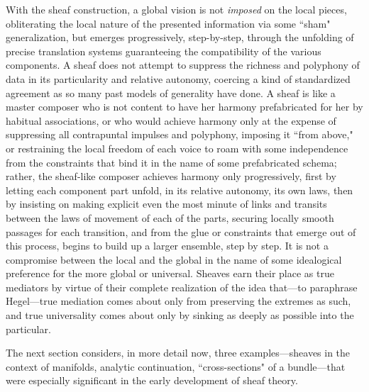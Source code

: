 \documentclass[a4paper]{book}
\theoremstyle{definition}
\theoremstyle{definition}
\theoremstyle{definition}
\theoremstyle{theorem}
\theoremstyle{definition}
\begin{document}
With the sheaf construction, a global vision is not \textit{imposed} on the local pieces, obliterating the local nature of the presented information via some ``sham" generalization, but emerges progressively, step-by-step, through the unfolding of precise translation systems guaranteeing the compatibility of the various components. A sheaf does not attempt to suppress the richness and polyphony of data in its particularity and relative autonomy, coercing a kind of standardized agreement as so many past models of generality have done. A sheaf is like a master composer who is not content to have her harmony prefabricated for her by habitual associations, or who would achieve harmony only at the expense of suppressing all contrapuntal impulses and polyphony, imposing it ``from above," or restraining the local freedom of each voice to roam with some independence from the constraints that bind it in the name of some prefabricated schema; rather, the sheaf-like composer achieves harmony only progressively, first by letting each component part unfold, in its relative autonomy, its own laws, then by insisting on making explicit even the most minute of links and transits between the laws of movement of each of the parts, securing locally smooth passages for each transition, and from the glue or constraints that emerge out of this process, begins to build up a larger ensemble, step by step. It is not a compromise between the local and the global in the name of some idealogical preference for the more global or universal. Sheaves earn their place as true mediators by virtue of their complete realization of the idea that---to paraphrase Hegel---true mediation comes about only from preserving the extremes as such, and true universality comes about only by sinking as deeply as possible into the particular. \par    
The next section considers, in more detail now, three examples---sheaves in the context of manifolds, analytic continuation, ``cross-sections" of a bundle---that were especially significant in the early development of sheaf theory. 
\end{document}
